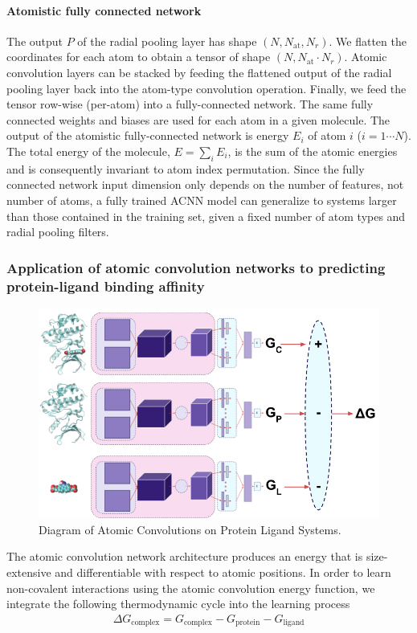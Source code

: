 \paragraph{Atomistic fully connected network}
The output $P$ of the radial pooling layer has shape $(N,N_\textrm{at}, N_r)$. We flatten the coordinates for each atom to obtain a tensor of shape $(N, N_\textrm{at}\cdot N_r)$. Atomic convolution layers can be stacked by feeding the flattened output of the radial pooling layer back into the atom-type convolution operation. Finally, we feed the tensor row-wise (per-atom) into a fully-connected network. The same fully connected weights and biases are used for each atom in a given molecule. The output of the atomistic fully-connected network is energy $E_i$ of atom $i$ ($i=1\cdots N$).  The total energy of the molecule, $E = \sum_i E_i$, is the sum of the atomic energies and is consequently invariant to atom index permutation.  Since the fully connected network input dimension only depends on the number of features, not number of atoms, a fully trained ACNN model can generalize to systems larger than those contained in the training set, given a fixed number of atom types and radial pooling filters.

\subsubsection{Application of atomic convolution networks to predicting protein-ligand binding affinity}
\begin{figure}[h]
  \centering
  \includegraphics[width=.8\textwidth]{Images/pldiagram2.png}
  \caption{Diagram of Atomic Convolutions on Protein Ligand Systems.}
  \label{fig:protein_ligand}
\end{figure}
The atomic convolution network architecture produces an energy that is size-extensive and differentiable with respect to atomic positions. In order to learn non-covalent interactions using the atomic convolution energy function, we integrate the following thermodynamic cycle into the learning process
\begin{eqnarray*}
\Delta G_\textrm{complex} = G_\textrm{complex} - G_\textrm{protein} - G_\textrm{ligand}
\end{eqnarray*}

